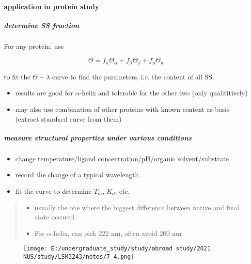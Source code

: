 \documentclass[]{article}
\let\oldparagraph\paragraph
\renewcommand{\paragraph}[1]{\oldparagraph{#1}\mbox{}}
\let\oldsubparagraph\subparagraph
\renewcommand{\subparagraph}[1]{\oldsubparagraph{#1}\mbox{}}
\begin{document}
\hypertarget{application-in-protein-study}{%
\paragraph{application in protein
study}\label{application-in-protein-study}}

\hypertarget{determine-ss-fraction}{%
\subparagraph{determine SS fraction}\label{determine-ss-fraction}}

For any protein, use

\[\Theta=f_\alpha\Theta_\alpha+f_\beta\Theta_\beta+f_u\Theta_u\]

to fit the \(\Theta-\lambda\) curve to find the parameters, i.e. the
content of all SS.

\begin{itemize}
\item
  results are good for \(\alpha\)-helix and tolerable for the other two
  (only qualititively)
\item
  may also use combination of other proteins with known content as basis
  (extract standard curve from them)
\end{itemize}

\hypertarget{measure-structural-properties-under-various-conditions}{%
\subparagraph{measure structural properties under various
conditions}\label{measure-structural-properties-under-various-conditions}}

\begin{itemize}
\item
  change temperature/ligand concentration/pH/organic solvent/substrate
\item
  record the change of a typical wavelength
\item
  fit the curve to determine \(T_m\), \(K_d\), etc.
\end{itemize}

\begin{quote}
\begin{itemize}
\item
  usually the one where \underline{the biggest difference} between
  native and final state occured. 
\item
  For \(\alpha\)-helix, can pick 222 nm, often avoid 200 nm
\end{itemize}
\end{quote}

\begin{figure}
\centering
\texttt{[image: E:/undergraduate\_study/study/abroad study/2021 NUS/study/LSM3243/notes/7\_4.png]}
\caption{}
\end{figure}
\end{document}
